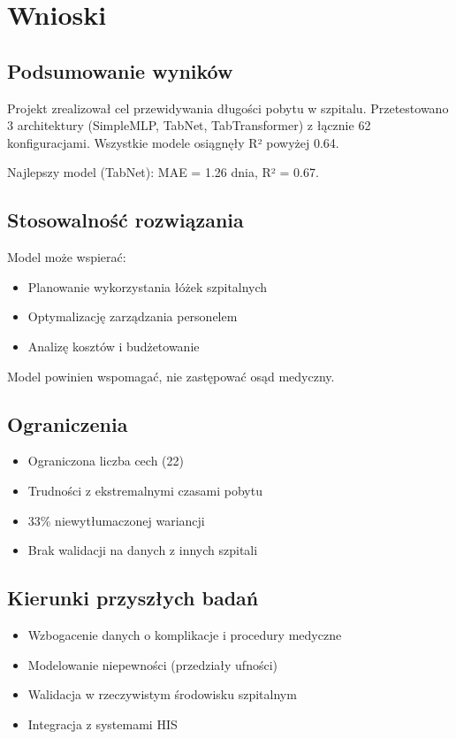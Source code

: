 \section{Wnioski}

\subsection{Podsumowanie wyników}

Projekt zrealizował cel przewidywania długości pobytu w szpitalu. Przetestowano 3 architektury (SimpleMLP, TabNet, TabTransformer) z łącznie 62 konfiguracjami. Wszystkie modele osiągnęły R² powyżej 0.64.

Najlepszy model (TabNet): MAE = 1.26 dnia, R² = 0.67.

\subsection{Stosowalność rozwiązania}

Model może wspierać:
\begin{itemize}
    \item Planowanie wykorzystania łóżek szpitalnych
    \item Optymalizację zarządzania personelem
    \item Analizę kosztów i budżetowanie
\end{itemize}

Model powinien wspomagać, nie zastępować osąd medyczny.

\subsection{Ograniczenia}

\begin{itemize}
    \item Ograniczona liczba cech (22)
    \item Trudności z ekstremalnymi czasami pobytu
    \item 33\% niewytłumaczonej wariancji
    \item Brak walidacji na danych z innych szpitali
\end{itemize}

\subsection{Kierunki przyszłych badań}

\begin{itemize}
    \item Wzbogacenie danych o komplikacje i procedury medyczne
    \item Modelowanie niepewności (przedziały ufności)
    \item Walidacja w rzeczywistym środowisku szpitalnym
    \item Integracja z systemami HIS
\end{itemize}

